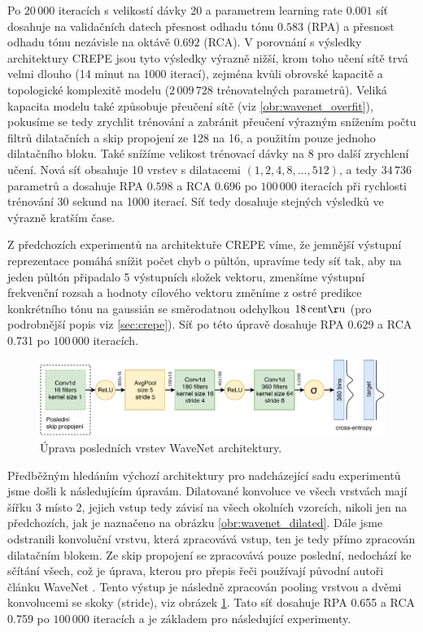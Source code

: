 Po $20\,000$ iteracích s velikostí dávky 20 a parametrem learning rate $0.001$ síť dosahuje na validačních datech přesnost odhadu tónu $0.583$ (RPA) a přesnost odhadu tónu nezávisle na oktávě $0.692$ (RCA). V porovnání s výsledky architektury CREPE jsou tyto výsledky výrazně nižší, krom toho učení sítě trvá velmi dlouho (14 minut na 1000 iterací), zejména kvůli obrovské kapacitě a topologické komplexitě modelu ($2\,009\,728$ trénovatelných parametrů). Veliká kapacita modelu také způsobuje přeučení sítě (viz \ref{obr:wavenet_overfit}), pokusíme se tedy zrychlit trénování a zabránit přeučení výrazným snížením počtu filtrů dilatačních a skip propojení ze 128 na 16, a použitím pouze jednoho dilatačního bloku. Také snížíme velikost trénovací dávky na 8 pro další zrychlení učení. Nová síť obsahuje 10 vrstev s dilatacemi $(1, 2, 4, 8, \dots, 512)$, a tedy $34\,736$ parametrů a dosahuje RPA $0.598$ a RCA $0.696$ po $100\,000$ iteracích při rychlosti trénování 30 sekund na 1000 iterací. Síť tedy dosahuje stejných výsledků ve výrazně kratším čase.

Z předchozích experimentů na architektuře CREPE víme, že jemnější výstupní reprezentace pomáhá snížit počet chyb o půltón, upravíme tedy síť tak, aby na jeden půltón připadalo 5 výstupních složek vektoru, zmenšíme výstupní frekvenční rozsah a hodnoty cílového vektoru změníme z ostré predikce konkrétního tónu na  gaussián se směrodatnou odchylkou $18\,\rm centů$ (pro podrobnější popis viz \ref{sec:crepe}). Síť po této úpravě dosahuje RPA 0.629 a RCA 0.731 po $100\,000$ iteracích. 

\begin{figure}[h]\centering
    \includegraphics[scale=0.8]{../img/wavenet_lastlayer}
    \caption{Úprava posledních vrstev WaveNet architektury.}\label{obr:wavenet_lastlayer}
\end{figure}

Předběžným hledáním výchozí architektury pro nadcházející sadu experimentů jsme došli k následujícím úpravám. Dilatované konvoluce ve všech vrstvách mají šířku 3 místo 2, jejich vstup tedy závisí na všech okolních vzorcích, nikoli jen na předchozích, jak je naznačeno na obrázku \ref{obr:wavenet_dilated}. Dále jsme odstranili konvoluční vrstvu, která zpracovává vstup, ten je tedy přímo zpracován dilatačním blokem. Ze skip propojení se zpracovává pouze poslední, nedochází ke sčítání všech, což je úprava, kterou pro přepis řeči používají původní autoři článku WaveNet \cite{Oord2016}. Tento výstup je následně zpracován pooling vrstvou a dvěmi konvolucemi se skoky (stride), viz obrázek \ref{obr:wavenet_lastlayer}. Tato síť dosahuje RPA 0.655 a RCA 0.759 po $100\,000$ iteracích a je základem pro následující experimenty.

